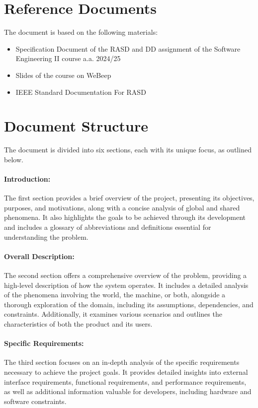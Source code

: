 \section{Reference Documents}
\label{sec:reference_documents}%
The document is based on the following materials:
\begin{itemize}
    \item Specification Document of the RASD and DD assignment of the Software Engineering II course a.a. 2024/25
    \item Slides of the course on WeBeep
    \item IEEE Standard Documentation For RASD 
\end{itemize}

\newpage

\section{Document Structure}
\label{sec:document_structure}%
The document is divided into six sections, each with its unique focus, as outlined below.
\paragraph{Introduction:} The first section provides a brief overview of the project, presenting its objectives, purposes, and motivations, along with a concise analysis of global and shared phenomena. It also highlights the goals to be achieved through its development and includes a glossary of abbreviations and definitions essential for understanding the problem.
\paragraph{Overall Description:} The second section offers a comprehensive overview of the problem, providing a high-level description of how the system operates. It includes a detailed analysis of the phenomena involving the world, the machine, or both, alongside a thorough exploration of the domain, including its assumptions, dependencies, and constraints. Additionally, it examines various scenarios and outlines the characteristics of both the product and its users.
\paragraph{Specific Requirements:} The third section focuses on an in-depth analysis of the specific requirements necessary to achieve the project goals. It provides detailed insights into external interface requirements, functional requirements, and performance requirements, as well as additional information valuable for developers, including hardware and software constraints.
